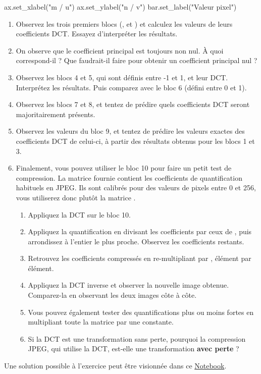 \documentclass [a4paper, 11pt] {article}
\begin{document}
\begin{exercice}{2}
\begin{python}
    ax.set_xlabel("m / u")
    ax.set_ylabel("n / v")
    bar.set_label("Valeur pixel")
        \end{python}
    
    \begin{enumerate}
        \item Observez les trois premiers blocs (,  et ) et calculez les valeurs de leurs coefficients DCT. Essayez d’interpréter les résultats.
        \item On observe que le coefficient principal est toujours non nul. À quoi correspond-il ? Que faudrait-il faire pour obtenir un coefficient principal nul ?
        \item Observez les blocs 4 et 5, qui sont définis entre -1 et 1, et leur DCT. Interprétez les résultats. Puis comparez avec le bloc 6 (défini entre 0 et 1).
        \item Observez les blocs 7 et 8, et tentez de prédire quels coefficients DCT seront majoritairement présents.
        \item Observez les valeurs du bloc 9, et tentez de prédire les valeurs exactes des coefficients DCT de celui-ci, à partir des résultats obtenus pour les blocs 1 et 3.
        \item Finalement, vous pouvez utiliser le bloc 10 pour faire un petit test de compression. La matrice  fournie contient les coefficients de quantification habituels en JPEG. Ils sont calibrés pour des valeurs de pixels entre 0 et 256, vous utiliserez donc plutôt la matrice .
        \begin{enumerate}
            \item Appliquez la DCT sur le bloc 10.
            \item Appliquez la quantification en divisant les coefficients par ceux de , puis arrondissez à l’entier le plus proche. Observez les coefficients restants.
            \item Retrouvez les coefficients compressés en re-multipliant par , élément par élément.
            \item Appliquez la DCT inverse et observer la nouvelle image obtenue. Comparez-la en observant les deux images côte à côte.
            \item Vous pouvez également tester des quantifications plus ou moins fortes en multipliant toute la matrice  par une constante.
            \item Si la DCT est une transformation sans perte, pourquoi la compression JPEG, qui utilise la DCT, est-elle une transformation \textbf{avec perte} ?
        \end{enumerate}
    \end{enumerate}
    
    \end{exercice}
    
    \begin{reponse}
        Une solution possible à l'exercice peut être visionnée dans ce \href{https://github.com/jeertmans/LELEC1930/blob/main/notebooks/seance4.ipynb}{Notebook}.
    \end{reponse}
\end{document}
